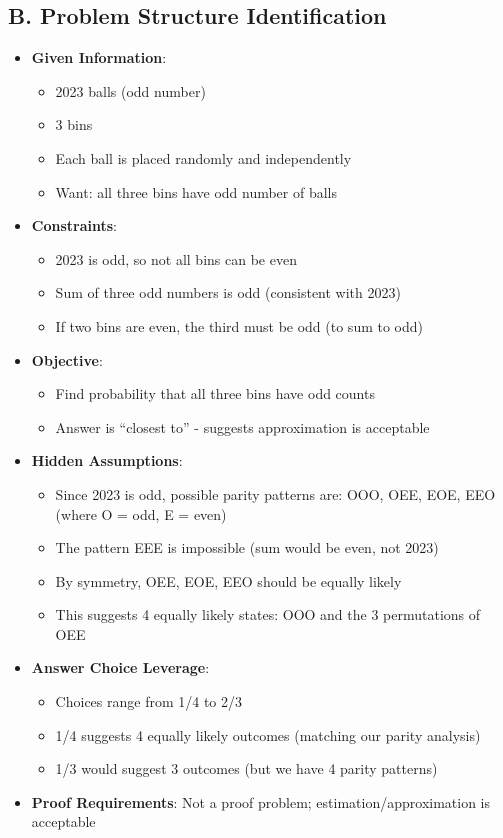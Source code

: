 \documentclass[12pt]{article}
\begin{document}
\begin{problemconfigbox}
\subsection*{B. Problem Structure Identification}
\begin{itemize}[leftmargin=*]
    \item \textbf{Given Information}: 
    \begin{itemize}
        \item 2023 balls (odd number)
        \item 3 bins
        \item Each ball is placed randomly and independently
        \item Want: all three bins have odd number of balls
    \end{itemize}
    \item \textbf{Constraints}: 
    \begin{itemize}
        \item 2023 is odd, so not all bins can be even
        \item Sum of three odd numbers is odd (consistent with 2023)
        \item If two bins are even, the third must be odd (to sum to odd)
    \end{itemize}
    \item \textbf{Objective}: 
    \begin{itemize}
        \item Find probability that all three bins have odd counts
        \item Answer is ``closest to'' - suggests approximation is acceptable
    \end{itemize}
    \item \textbf{Hidden Assumptions}: 
    \begin{itemize}
        \item Since 2023 is odd, possible parity patterns are: OOO, OEE, EOE, EEO (where O = odd, E = even)
        \item The pattern EEE is impossible (sum would be even, not 2023)
        \item By symmetry, OEE, EOE, EEO should be equally likely
        \item This suggests 4 equally likely states: OOO and the 3 permutations of OEE
    \end{itemize}
    \item \textbf{Answer Choice Leverage}: 
    \begin{itemize}
        \item Choices range from 1/4 to 2/3
        \item 1/4 suggests 4 equally likely outcomes (matching our parity analysis)
        \item 1/3 would suggest 3 outcomes (but we have 4 parity patterns)
    \end{itemize}
    \item \textbf{Proof Requirements}: Not a proof problem; estimation/approximation is acceptable
\end{itemize}


\end{problemconfigbox}
\end{document}
